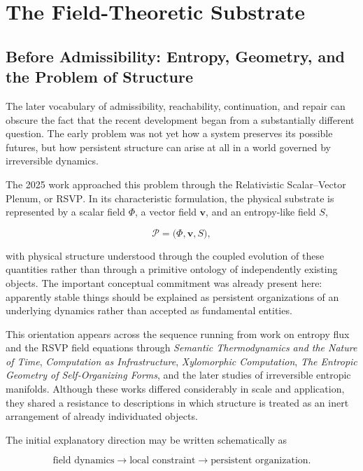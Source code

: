 \documentclass[11pt]{article}
\theoremstyle{remark}
\newcommand{\RSVP}{\textsc{RSVP}}
\begin{document}
\section{The Field-Theoretic Substrate}

\subsection{Before Admissibility: Entropy, Geometry, and the Problem of Structure}

The later vocabulary of admissibility, reachability, continuation, and repair can obscure the fact that the recent development began from a substantially different question. The early problem was not yet how a system preserves its possible futures, but how persistent structure can arise at all in a world governed by irreversible dynamics.

The 2025 work approached this problem through the Relativistic Scalar--Vector Plenum, or \RSVP{}. In its characteristic formulation, the physical substrate is represented by a scalar field $\Phi$, a vector field $\mathbf{v}$, and an entropy-like field $S$,

\begin{equation}
\mathcal{P}
=
\bigl(
\Phi,
\mathbf{v},
S
\bigr),
\end{equation}

with physical structure understood through the coupled evolution of these quantities rather than through a primitive ontology of independently existing objects. The important conceptual commitment was already present here: apparently stable things should be explained as persistent organizations of an underlying dynamics rather than accepted as fundamental entities.

This orientation appears across the sequence running from work on entropy flux and the \RSVP{} field equations through \emph{Semantic Thermodynamics and the Nature of Time}, \emph{Computation as Infrastructure}, \emph{Xylomorphic Computation}, \emph{The Entropic Geometry of Self-Organizing Forms}, and the later studies of irreversible entropic manifolds. Although these works differed considerably in scale and application, they shared a resistance to descriptions in which structure is treated as an inert arrangement of already individuated objects.

The initial explanatory direction may be written schematically as

\begin{equation}
\text{field dynamics}
\longrightarrow
\text{local constraint}
\longrightarrow
\text{persistent organization}.
\end{equation}
\end{document}
